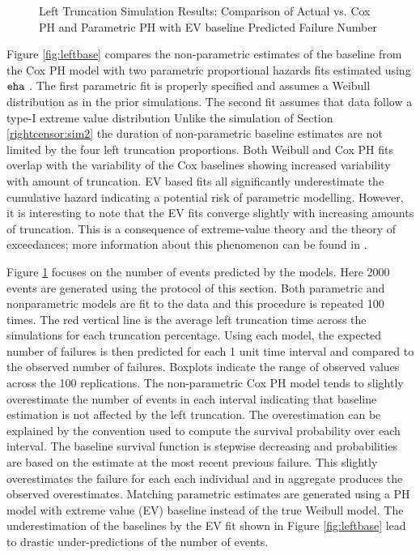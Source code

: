 \documentclass[12pt,letterpaper]{article}
\begin{document}
\begin{figure}[h!]
 	\caption{Left Truncation Simulation Results: Comparison of Actual vs. Cox PH and Parametric PH with EV baseline Predicted Failure Number}
 	\label{fig:lefttruncation}
 \end{figure}
Figure \ref{fig:leftbase} compares the non-parametric estimates of the baseline from the Cox PH model with two parametric proportional hazards fits estimated using $\tt eha$ \citep{eha}.  The first parametric fit is properly specified and assumes a  Weibull distribution as in the prior simulations.  The second fit assumes that data follow a type-I extreme value distribution%
Unlike the simulation of Section \ref{rightcensor:sim2} the duration of non-parametric baseline estimates are not limited by the four left truncation proportions.  Both Weibull and Cox PH fits overlap with the variability of the Cox baselines showing increased variability with amount of truncation.  EV based fits all significantly underestimate the cumulative hazard indicating a potential risk of parametric modelling.  However, it is interesting to note that the EV fits converge slightly with increasing amounts of truncation.  This is a consequence of extreme-value theory and the theory of exceedances; more information about this phenomenon can be found in \citet{coles2001}.

Figure \ref{fig:lefttruncation} focuses on the number of
events predicted by the models.  Here 2000 events are generated using the protocol of this section. Both parametric and nonparametric models are fit to the data and this procedure is repeated 100 times. The red vertical line is the average left truncation time across the simulations for each truncation percentage.  Using each model, the expected number of failures is then predicted for each 1 unit time interval and compared to the observed number of failures. Boxplots indicate the range of observed values across the 100 replications. The non-parametric Cox PH model tends to slightly overestimate the number of events in each interval indicating that baseline estimation is not affected by the left truncation.  The overestimation can be explained by the convention used to compute the survival probability over each interval.  The baseline survival function is stepwise decreasing and probabilities are based on the estimate at the most recent previous failure.  This slightly overestimates the failure for each each individual and in aggregate produces the observed overestimates.
Matching parametric estimates are generated using a PH model with extreme value (EV) baseline instead of the true Weibull model.  The underestimation of the baselines by the EV fit shown in Figure \ref{fig:leftbase} lead to drastic under-predictions of the number of events.
\end{document}
